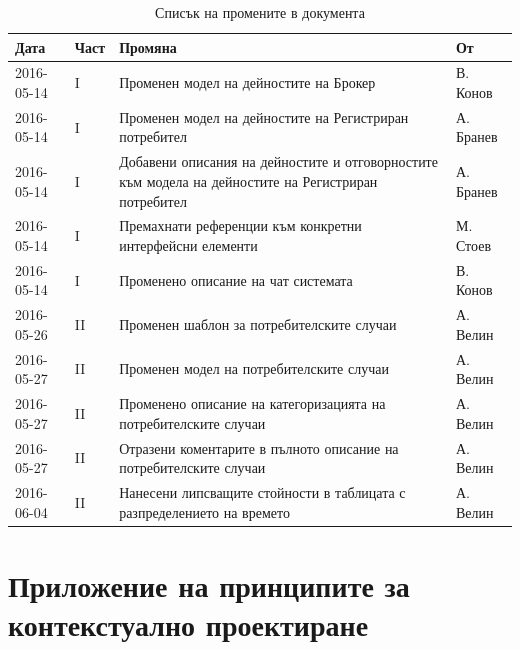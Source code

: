 \documentclass[a4paper]{article}
\begin{document}
\begin{table}[h]
\centering
\label{my-label}
\begin{tabular}{|p{1.7cm}|p{1cm}|p{11cm}|p{1.6cm}|}
\hline
Дата       & Част & Промяна                                                                                             & От        \\ \hline
\hline
2016-05-14 & I    & Променен модел на дейностите на Брокер                                                              					& В. Конов  \\ \hline
2016-05-14 & I    & Променен модел на дейностите на Регистриран потребител                                              					& А. Бранев \\ \hline
2016-05-14 & I    & Добавени описания на дейностите и отговорностите към модела на 
дейностите на Регистриран потребител 
					& А. Бранев \\ \hline
2016-05-14 & I    & Премахнати референции към конкретни интерфейсни елементи                                            					& М. Стоев  \\ \hline
2016-05-14 & I    & Променено описание на чат системата                                                                 					& В. Конов  \\ \hline
2016-05-26 & II	  & Променен шаблон за потребителските случаи																& А. Велин	\\ \hline
2016-05-27 & II	  & Променен модел на потребителските случаи																& А. Велин	\\ \hline
2016-05-27 & II	  & Променено описание на категоризацията на потребителските случаи											& А. Велин	\\ \hline
2016-05-27 & II	  & Отразени коментарите в пълното описание на потребителските случаи
					& А. Велин	\\ \hline
2016-06-04 & II	  & Нанесени липсващите стойности в таблицата с разпределението на времето
					& А. Велин	\\ \hline
\end{tabular}
\caption{Списък на промените в документа}
\end{table}

\clearpage

\part{Приложение на принципите за контекстуално проектиране} \label{cd}
\setcounter{section}{0}
\setcounter{table}{0}
\end{document}
